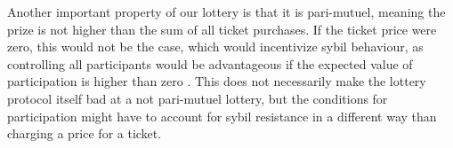 Another important property of our lottery is that it is pari-mutuel, meaning the prize is not higher than the sum of all ticket purchases. If the ticket price were zero, this would not be the case, which would incentivize sybil behaviour, as controlling all participants would be advantageous if the expected value of participation is higher than zero \cite{syverson_weakly_1998}. This does not necessarily make the lottery protocol itself bad at a not pari-mutuel lottery, but the conditions for participation might have to account for sybil resistance in a different way than charging a price for a ticket.
